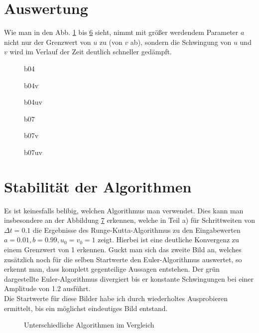 \documentclass[12pt,a4paper,titlepage,headinclude,bibtotoc]{scrartcl}
\begin{document}
\section{Auswertung}
\label{sec:auswertung}
Wie man in den Abb. \ref{b04u1v1} bis \ref{b07u1v1uv} sieht, nimmt mit größer werdendem Parameter $a$ nicht nur der Grenzwert von $u$ zu (von $v$ ab), sondern die Schwingung von $u$ und $v$ wird im Verlauf der Zeit deutlich schneller gedämpft.
\begin{figure}
\centering

\caption{b04}\label{b04u1v1}
\end{figure}
\begin{figure}
\centering

\caption{b04v}\label{b04u1v1v}
\end{figure}
\begin{figure}
\centering

\caption{b04uv}\label{b04u1v1uv}
\end{figure}
\begin{figure}
\centering

\caption{b07\label{b07u1v1}}
\end{figure}
\begin{figure}
\centering

\caption{b07v\label{b07u1v1v}}
\end{figure}
\begin{figure}
\centering

\caption{b07uv}\label{b07u1v1uv}
\end{figure}


\section{Stabilität der Algorithmen}
Es ist keinesfalls belibig, welchen Algorithmus man verwendet.
Dies kann man insbesondere an der Abbildung \ref{fig:stabi} erkennen, welche in Teil a) für Schrittweiten von $\Delta t=0.1$ die Ergebnisse des Runge-Kutta-Algorithmus zu den Eingabewerten $a=0.01, b=0.99, u_0=v_0=1$ zeigt.
Hierbei ist eine  deutliche Konvergenz zu einem  Grenzwert von 1 erkennen.
Guckt man sich das zweite Bild an, welches zusätzlich noch für die selben Startwerte den Euler-Algorithmus auswertet, so erkennt man, dass komplett gegenteilige Aussagen entstehen.
Der grün dargestellte Euler-Algorithmus divergiert bis er konstante Schwingungen bei einer Amplitude von 1.2 ausführt.\\
Die Startwerte für diese Bilder habe ich durch wiederholtes Ausprobieren ermittelt, bis ein möglichst eindeutiges Bild entstand.

\begin{figure}[htb]
  \centering
   \hfill
   \caption{Unterschiedliche Algorithmen im Vergleich}
   \label{fig:stabi}
 \end{figure}
\end{document}
